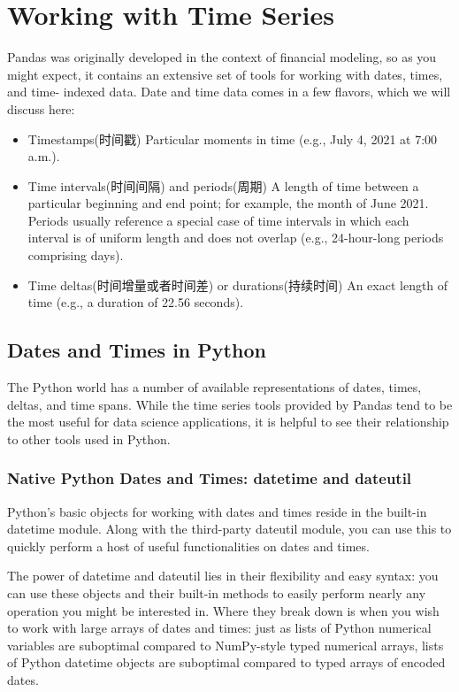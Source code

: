 \chapter{Working with Time Series\label{Ch23}}

Pandas was originally developed in the context of financial modeling, so as you might
expect, it contains an extensive set of tools for working with dates, times, and time-
indexed data. Date and time data comes in a few flavors, which we will discuss here:

\begin{itemize}
    \item Timestamps(时间戳)
          Particular moments in time (e.g., July 4, 2021 at 7:00 a.m.).
    \item Time intervals(时间间隔) and periods(周期)
          A length of time between a particular beginning and end point; for example, the
          month of June 2021. Periods usually reference a special case of time intervals in
          which each interval is of uniform length and does not overlap (e.g., 24-hour-long
          periods comprising days).
    \item Time deltas(时间增量或者时间差) or durations(持续时间)
          An exact length of time (e.g., a duration of 22.56 seconds).
\end{itemize}

\section{Dates and Times in Python}
The Python world has a number of available representations of dates, times, deltas,
and time spans. While the time series tools provided by Pandas tend to be the most
useful for data science applications, it is helpful to see their relationship to other tools
used in Python.
\subsection*{Native Python Dates and Times: datetime and dateutil}
Python's basic objects for working with dates and times reside in the built-in
datetime module. Along with the third-party dateutil module, you can use this to
quickly perform a host of useful functionalities on dates and times.

The power of datetime and dateutil lies in their flexibility and easy syntax: you can
use these objects and their built-in methods to easily perform nearly any operation
you might be interested in. Where they break down is when you wish to work with
large arrays of dates and times: just as lists of Python numerical variables are suboptimal compared to NumPy-style typed numerical arrays, lists of Python datetime
objects are suboptimal compared to typed arrays of encoded dates.
